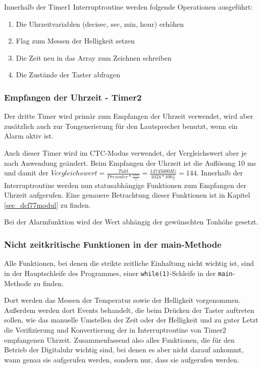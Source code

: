 Innerhalb der Timer1 Interruptroutine werden folgende Operationen ausgeführt:
\begin{enumerate}
  \item Die Uhrzeitvariablen (decisec, sec, min, hour) erhöhen
  \item Flag zum Messen der Helligkeit setzen
  \item Die Zeit neu in das Array zum Zeichnen schreiben
  \item Die Zustände der Taster abfragen
\end{enumerate}
 
\subsubsection{Empfangen der Uhrzeit - Timer2}
Der dritte Timer wird primär zum Empfangen der Uhrzeit verwendet, wird aber zusätzlich auch zur Tongenerierung für den Lautsprecher benutzt, wenn ein Alarm aktiv ist.

Auch dieser Timer wird im CTC-Modus verwendet, der Vergleichswert aber je nach Anwendung geändert. Beim Empfangen der Uhrzeit ist die Auflösung 10 ms und damit der $Vergleichswert = \frac{Takt}{Prescaler * \frac{INT}{s}} = \frac{14745600 Hz}{1024 * 100 \frac{1}{s}} = 144$. Innerhalb der Interruptroutine werden nun statusabhängige Funktionen zum Empfangen der Uhrzeit aufgerufen. Eine genauere Betrachtung dieser Funktionen ist in Kapitel \ref{sec_dcf77modul} zu finden.

Bei der Alarmfunktion wird der Wert abhängig der gewünschten Tonhöhe gesetzt.

\subsubsection{Nicht zeitkritische Funktionen in der main-Methode}
Alle Funktionen, bei denen die strikte zeitliche Einhaltung nicht wichtig ist, sind in der Hauptschleife des Programmes, einer \texttt{while(1)}-Schleife in der \texttt{main}-Methode zu finden.

Dort werden das Messen der Temperatur sowie der Helligkeit vorgenommen. Außerdem werden dort Events behandelt, die beim Drücken der Taster auftreten sollen, wie das manuelle Umstellen der Zeit oder der Helligkeit und zu guter Letzt die Verifizierung und Konvertierung der in Interruptroutine von Timer2 empfangenen Uhrzeit. Zusammenfassend also alles Funktionen, die für den Betrieb der Digitaluhr wichtig sind, bei denen es aber nicht darauf ankommt, wann genau sie aufgerufen werden, sondern nur, dass sie aufgerufen werden. 


